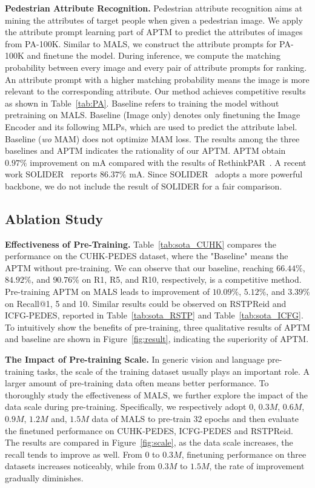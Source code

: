 \documentclass[sigconf]{acmart}
\begin{document}
\noindent\textbf{Pedestrian Attribute Recognition.}
Pedestrian attribute recognition aims at mining the attributes of target people when given a pedestrian image. We apply the attribute prompt learning part of APTM to predict the attributes of images from PA-100K. Similar to MALS, we construct the attribute prompts for PA-100K and finetune the model.
During inference, we compute the matching probability between every image and every pair of attribute prompts for ranking.
An attribute prompt with a higher matching probability means the image is more relevant to the corresponding attribute.
Our method achieves competitive results as shown in Table~\ref{tab:PA}.
Baseline refers to training the model without pretraining on MALS.
Baseline (Image only) denotes only finetuning the Image Encoder and its following MLPs, which are used to predict the attribute label. 
Baseline (\emph{wo} MAM) does not optimize MAM loss.
The results among the three baselines and APTM indicates the rationality of our APTM.
APTM obtain $0.97 \%$ improvement on mA compared with the results of RethinkPAR~\cite{jia2021rethinking}. 
A recent work SOLIDER~\cite{chen2023beyond} reports $86.37 \%$ mA. Since SOLIDER~\cite{chen2023beyond} adopts a more powerful backbone, we do not include the result of SOLIDER for a fair comparison. 


\subsection{Ablation Study} 


\noindent\textbf{Effectiveness of Pre-Training.} 
Table~\ref{tab:sota_CUHK} compares the performance on the CUHK-PEDES dataset, where the "Baseline" means the APTM without pre-training. We can observe that our baseline, reaching $66.44 \%$, $84.92 \%$, and $90.76 \%$ on R1, R5, and R10, respectively, is a competitive method. Pre-training APTM on MALS leads to improvement of $10.09 \%$, $5.12 \%$, and $3.39 \%$ on Recall@1, 5 and 10. Similar results could be observed on RSTPReid and ICFG-PEDES, reported in Table~\ref{tab:sota_RSTP} and Table~\ref{tab:sota_ICFG}. 
To intuitively show the benefits of pre-training, three qualitative results of APTM and baseline are shown in Figure~\ref{fig:result}, indicating the superiority of APTM.


\noindent\textbf{The Impact of Pre-training Scale.} 
In generic vision and language pre-training tasks, the scale of the training dataset usually plays an important role. A larger amount of pre-training data often means better performance.
To thoroughly study the effectiveness of MALS, we further explore the impact of the data scale during pre-training. Specifically, we respectively adopt $0$, $0.3M$, $0.6M$, $0.9M$, $1.2M$ and, $1.5M$ data of MALS to pre-train 32 epochs and then evaluate the finetuned performance on CUHK-PEDES, ICFG-PEDES and RSTPReid.
The results are compared in Figure~\ref{fig:scale}, as the data scale increases, the recall tends to improve as well. From $0$ to $0.3M$, finetuning performance on three datasets increases noticeably, while from $0.3M$ to $1.5M$, the rate of improvement gradually diminishes.
\end{document}
